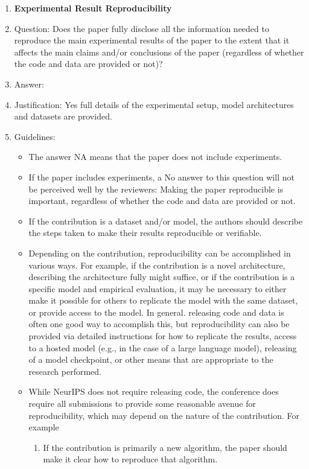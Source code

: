 \documentclass{article}
\begin{document}
\begin{enumerate}
    \item {\bf Experimental Result Reproducibility}
    \item[] Question: Does the paper fully disclose all the information needed to reproduce the main experimental results of the paper to the extent that it affects the main claims and/or conclusions of the paper (regardless of whether the code and data are provided or not)?
    \item[] Answer: \answerYes{} %
    \item[] Justification: Yes full details of the experimental setup, model architectures and datasets are provided. 
    \item[] Guidelines:
    \begin{itemize}
        \item The answer NA means that the paper does not include experiments.
        \item If the paper includes experiments, a No answer to this question will not be perceived well by the reviewers: Making the paper reproducible is important, regardless of whether the code and data are provided or not.
        \item If the contribution is a dataset and/or model, the authors should describe the steps taken to make their results reproducible or verifiable. 
        \item Depending on the contribution, reproducibility can be accomplished in various ways. For example, if the contribution is a novel architecture, describing the architecture fully might suffice, or if the contribution is a specific model and empirical evaluation, it may be necessary to either make it possible for others to replicate the model with the same dataset, or provide access to the model. In general. releasing code and data is often one good way to accomplish this, but reproducibility can also be provided via detailed instructions for how to replicate the results, access to a hosted model (e.g., in the case of a large language model), releasing of a model checkpoint, or other means that are appropriate to the research performed.
        \item While NeurIPS does not require releasing code, the conference does require all submissions to provide some reasonable avenue for reproducibility, which may depend on the nature of the contribution. For example
        \begin{enumerate}
            \item If the contribution is primarily a new algorithm, the paper should make it clear how to reproduce that algorithm.

\end{enumerate}
\end{itemize}
\end{enumerate}
\end{document}
